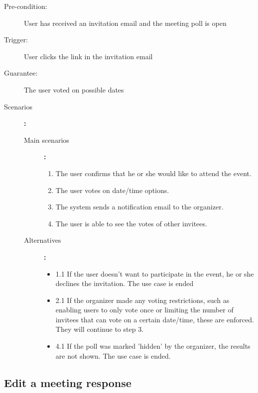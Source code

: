 \begin{description}
	\item[Pre-condition:] User has received an invitation email and the meeting poll is open
	\item[Trigger:] User clicks the link in the invitation email
	\item[Guarantee:] The user voted on possible dates
	\item[Scenarios]\textbf{:}\\
				\begin{description}
					\item[Main scenarios]\textbf{:}\\
								\begin{enumerate}
									\item The user confirms that he or she would like to attend the event.
									\item The user votes on date/time options.
									\item The system sends a notification email to the organizer.
									\item The user is able to see the votes of other invitees.
								\end{enumerate}
					\item[Alternatives]\textbf{:}\\
								\begin{itemize}
									\item 1.1 If the user doesn't want to participate in the event, he or she declines the invitation.	The use case is ended
									\item 2.1 If the organizer made any voting restrictions, such as enabling users to only vote once or limiting the number of invitees that can vote on a certain date/time, these are enforced. They will continue to step 3.
									\item 4.1 If the poll was marked 'hidden' by the organizer, the results are not shown. The use case is ended.
								\end{itemize}
				\end{description}
\end{description}
\pagebreak
\subsection{Edit a meeting response}

